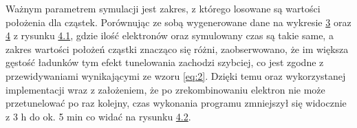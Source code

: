 Ważnym parametrem symulacji jest zakres, z którego losowane są wartości położenia dla cząstek. Porównując ze sobą wygenerowane dane na wykresie  \hyperref[wykres:1]{3} oraz \hyperref[wykres:2]{4} z rysunku \hyperref[rys:1]{4.1}, gdzie ilość elektronów oraz symulowany czas są takie same, a zakres wartości położeń cząstki znacząco się różni, zaobserwowano, że im większa gęstość ładunków tym efekt tunelowania zachodzi szybciej, co jest zgodne z przewidywaniami wynikającymi ze wzoru \ref{eq:2}. Dzięki temu oraz wykorzystanej implementacji wraz z założeniem, że po zrekombinowaniu elektron nie może przetunelować po raz kolejny, czas wykonania programu zmniejszył się widocznie z 3 h do ok. 5 min co widać na rysunku \hyperref[rys:2]{4.2}. 
